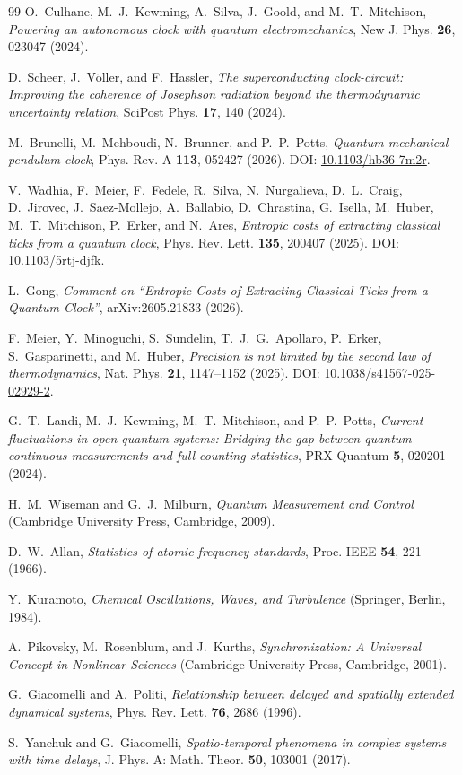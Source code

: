 \documentclass[aps,pre,reprint,amsmath,amssymb,floatfix,nofootinbib]{revtex4-2}
\begin{document}
\begin{thebibliography}{99}
O.~Culhane, M.~J.~Kewming, A.~Silva, J.~Goold, and M.~T.~Mitchison,
\emph{Powering an autonomous clock with quantum electromechanics},
New J. Phys. \textbf{26}, 023047 (2024).

D.~Scheer, J.~V\"oller, and F.~Hassler,
\emph{The superconducting clock-circuit: Improving the coherence of Josephson radiation beyond the thermodynamic uncertainty relation},
SciPost Phys. \textbf{17}, 140 (2024).

M.~Brunelli, M.~Mehboudi, N.~Brunner, and P.~P.~Potts,
\emph{Quantum mechanical pendulum clock},
Phys. Rev. A \textbf{113}, 052427 (2026).
DOI: \href{https://doi.org/10.1103/hb36-7m2r}{10.1103/hb36-7m2r}.

V.~Wadhia, F.~Meier, F.~Fedele, R.~Silva, N.~Nurgalieva,
D.~L.~Craig, D.~Jirovec, J.~Saez-Mollejo, A.~Ballabio,
D.~Chrastina, G.~Isella, M.~Huber, M.~T.~Mitchison,
P.~Erker, and N.~Ares,
\emph{Entropic costs of extracting classical ticks from a quantum clock},
Phys. Rev. Lett. \textbf{135}, 200407 (2025).
DOI: \href{https://doi.org/10.1103/5rtj-djfk}{10.1103/5rtj-djfk}.

L.~Gong,
\emph{Comment on ``Entropic Costs of Extracting Classical Ticks from a Quantum Clock''},
arXiv:2605.21833 (2026).

F.~Meier, Y.~Minoguchi, S.~Sundelin, T.~J.~G.~Apollaro, P.~Erker, S.~Gasparinetti, and M.~Huber,
\emph{Precision is not limited by the second law of thermodynamics},
Nat. Phys. \textbf{21}, 1147--1152 (2025).
DOI: \href{https://doi.org/10.1038/s41567-025-02929-2}{10.1038/s41567-025-02929-2}.

G.~T.~Landi, M.~J.~Kewming, M.~T.~Mitchison, and P.~P.~Potts,
\emph{Current fluctuations in open quantum systems: Bridging the gap between quantum continuous measurements and full counting statistics},
PRX Quantum \textbf{5}, 020201 (2024).

H.~M.~Wiseman and G.~J.~Milburn,
\emph{Quantum Measurement and Control}
(Cambridge University Press, Cambridge, 2009).

D.~W.~Allan,
\emph{Statistics of atomic frequency standards},
Proc. IEEE \textbf{54}, 221 (1966).

Y.~Kuramoto,
\emph{Chemical Oscillations, Waves, and Turbulence}
(Springer, Berlin, 1984).

A.~Pikovsky, M.~Rosenblum, and J.~Kurths,
\emph{Synchronization: A Universal Concept in Nonlinear Sciences}
(Cambridge University Press, Cambridge, 2001).

G.~Giacomelli and A.~Politi,
\emph{Relationship between delayed and spatially extended dynamical systems},
Phys. Rev. Lett. \textbf{76}, 2686 (1996).

S.~Yanchuk and G.~Giacomelli,
\emph{Spatio-temporal phenomena in complex systems with time delays},
J. Phys. A: Math. Theor. \textbf{50}, 103001 (2017).

\end{thebibliography}
\end{document}
